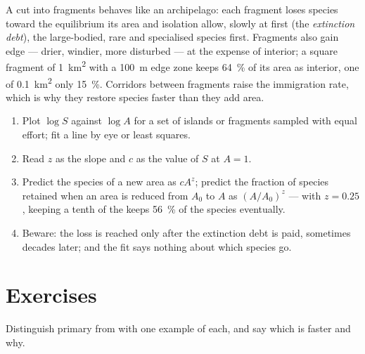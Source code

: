 \begin{proposition}[Fragmentation]\label{prop:b1:ecosystem-dynamics:fragmentation}
A  cut into fragments behaves like an archipelago: each
fragment loses species toward the equilibrium its area and isolation
allow, slowly at first (the \emph{extinction debt}), the large-bodied,
rare and specialised species first. Fragments also gain edge --- drier,
windier, more disturbed --- at the expense of interior; a square
fragment of \qty{1}{km^2} with a \qty{100}{m} edge zone keeps
\qty{64}{\%} of its area as interior, one of \qty{0.1}{km^2} only
\qty{15}{\%}. Corridors between fragments raise the immigration rate,
which is why they restore species faster than they add area.
\end{proposition}

\begin{method}\label{met:b1:ecosystem-dynamics:sar}
\begin{enumerate}
  \item Plot $\log S$ against $\log A$ for a set of islands or
        fragments sampled with equal effort; fit a line by eye or
        least squares.
  \item Read $z$ as the slope and $c$ as the value of $S$ at $A = 1$.
  \item Predict the species of a new area as $cA^z$; predict the
        fraction of species retained when an area is reduced from
        $A_0$ to $A$ as $(A/A_0)^z$ --- with $z = 0.25$, keeping a tenth
        of the  keeps \qty{56}{\%} of the species eventually.
  \item Beware: the loss is reached only after the extinction debt is
        paid, sometimes decades later; and the fit says nothing about
        which species go.
\end{enumerate}
\end{method}

\section{Exercises}

\begin{exercise}[$\star$]\label{exo:b1:ecosystem-dynamics:1}
Distinguish primary from  with one example of
each, and say which is faster and why.
\end{exercise}


